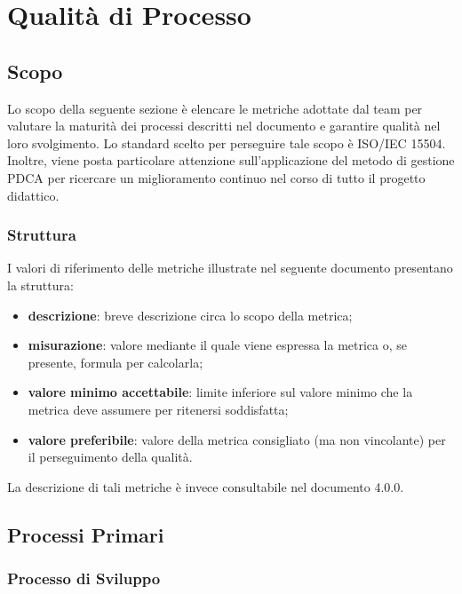 \section{Qualità di Processo}

\subsection{Scopo}
Lo scopo della seguente sezione è elencare le metriche adottate dal team \Gruppo{} per valutare la maturità dei processi descritti nel documento \textit{\NdP} e garantire qualità nel loro svolgimento. Lo standard scelto per perseguire tale scopo è ISO/IEC 15504. Inoltre, viene posta particolare attenzione sull'applicazione del metodo di gestione PDCA per ricercare un miglioramento continuo nel corso di tutto il progetto didattico.

\subsubsection{Struttura}
I valori di riferimento delle metriche illustrate nel seguente documento presentano la struttura:
\begin{itemize}
	\item{\textbf{descrizione}: breve descrizione circa lo scopo della metrica;}
	\item{\textbf{misurazione}: valore mediante il quale viene espressa la metrica o, se presente, formula per calcolarla;}
	\item{\textbf{valore minimo accettabile}: limite inferiore sul valore minimo che la metrica deve assumere per ritenersi soddisfatta;}
	\item{\textbf{valore preferibile}: valore della metrica consigliato (ma non vincolante) per il perseguimento della qualità.}
\end{itemize}
La descrizione di tali metriche è invece consultabile nel documento \NdP{} 4.0.0.

\subsection{Processi Primari}

	\subsubsection{Processo di Sviluppo}
	
